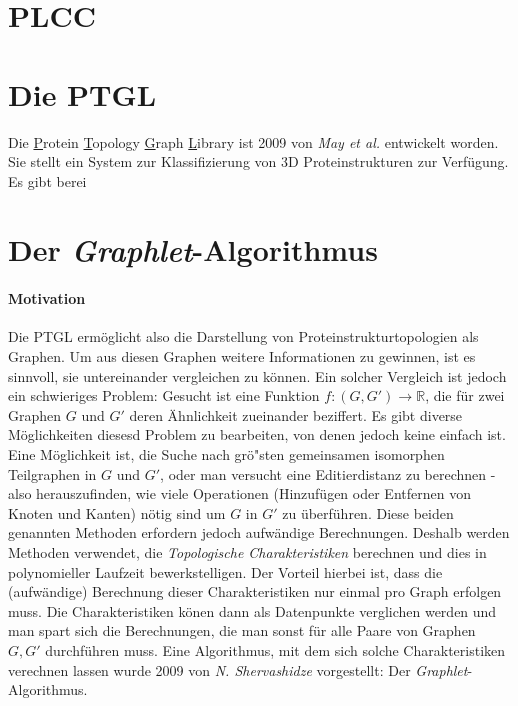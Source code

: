 \documentclass{report}
\begin{document}
\section{PLCC}

\section{Die PTGL}


Die \underline{P}rotein \underline{T}opology \underline{G}raph \underline{L}ibrary ist 2009 von \textit{May et al.} \cite{ptgl1} entwickelt worden. Sie stellt ein System zur Klassifizierung von 3D Proteinstrukturen zur Verf\"ugung. Es gibt berei


\section{Der \textit{Graphlet}-Algorithmus}

\paragraph{Motivation}
Die PTGL \cite{vplg} erm\"oglicht also die Darstellung von Proteinstrukturtopologien als Graphen. Um aus diesen Graphen weitere Informationen zu gewinnen, ist es sinnvoll, sie untereinander vergleichen zu k\"onnen. Ein solcher Vergleich ist jedoch ein schwieriges Problem: Gesucht ist eine Funktion $f: (G,G') \rightarrow \mathbb{R} $, die f\"ur zwei Graphen $G$ und $G'$ deren \"Ahnlichkeit zueinander beziffert.
Es gibt diverse M\"oglichkeiten diesesd Problem zu bearbeiten, von denen jedoch keine einfach ist.
Eine M\"oglichkeit ist, die Suche nach gr\"o"sten gemeinsamen isomorphen Teilgraphen in $G$ und $G'$, oder man versucht eine Editierdistanz zu berechnen - also herauszufinden, wie viele Operationen (Hinzuf\"ugen oder Entfernen von Knoten und Kanten) n\"otig sind um $G$ in $G'$ zu \"uberf\"uhren. Diese beiden genannten Methoden erfordern jedoch aufw\"andige Berechnungen.
Deshalb werden Methoden verwendet, die \emph{Topologische Charakteristiken} berechnen und dies in polynomieller Laufzeit bewerkstelligen. Der Vorteil hierbei ist, dass die (aufw\"andige) Berechnung dieser Charakteristiken nur einmal pro Graph erfolgen muss. Die Charakteristiken k\"onen dann als Datenpunkte verglichen werden und man spart sich die Berechnungen, die man sonst f\"ur alle Paare von Graphen $G,G'$ durchf\"uhren muss.
Eine Algorithmus, mit dem sich solche Charakteristiken verechnen lassen wurde 2009 von \textit{N. Shervashidze} vorgestellt: Der \textit{Graphlet}-Algorithmus.
\end{document}
